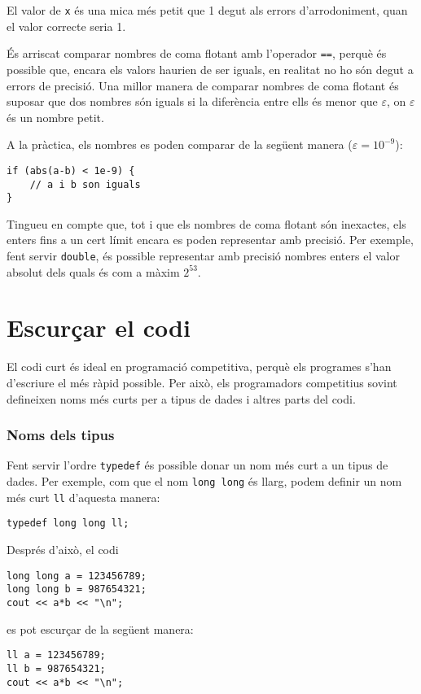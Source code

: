 El valor de \texttt{x} és una mica més petit que 1 degut
als errors d'arrodoniment, quan el valor correcte seria 1.

És arriscat comparar nombres de coma flotant
amb l'operador \texttt{==},
perquè és possible que, encara els valors haurien de
ser iguals, en realitat no ho s\'on degut
a errors de precisió.
Una millor manera de comparar nombres de coma flotant
és suposar que dos nombres són iguals
si la diferència entre ells és menor que $\varepsilon$,
on $\varepsilon$ és un nombre petit.

A la pràctica, els nombres es poden comparar
de la següent manera ($\varepsilon=10^{-9}$):

\begin{lstlisting}
if (abs(a-b) < 1e-9) {
    // a i b son iguals
}
\end{lstlisting}

Tingueu en compte que, tot i que els nombres de coma flotant són inexactes,
els enters fins a un cert límit encara es poden
representar amb precisió.
Per exemple, fent servir \texttt{double},
és possible representar amb precisió
nombres enters el valor absolut dels quals és com a màxim $2^{53}$.

\section{Escurçar el codi}

El codi curt és ideal en programació competitiva,
perquè els programes s'han d'escriure
el més ràpid possible.
Per això, els programadors competitius sovint defineixen
noms més curts per a tipus de dades i altres parts del codi.

\subsubsection{Noms dels tipus}
Fent servir l'ordre \texttt{typedef}
és possible donar un nom més curt
a un tipus de dades.
Per exemple, com que el nom \texttt{long long} és llarg,
podem definir un nom més curt \texttt{ll} d'aquesta manera:
\begin{lstlisting}
typedef long long ll;
\end{lstlisting}
Després d'això, el codi
\begin{lstlisting}
long long a = 123456789;
long long b = 987654321;
cout << a*b << "\n";
\end{lstlisting}
es pot escurçar de la següent manera:
\begin{lstlisting}
ll a = 123456789;
ll b = 987654321;
cout << a*b << "\n";
\end{lstlisting}

